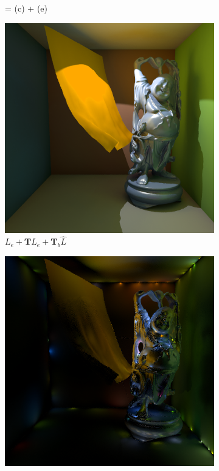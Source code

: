 \begin{figure}
\begin{center}
\begin{subfigure}[b]{0.195\textwidth}
		\caption{= (c) + (e)}
	\end{subfigure}
	\begin{subfigure}[b]{0.195\textwidth}
		\includegraphics[width=1.0\textwidth]{graphics/ir/ir-7-2}
		\caption{$L_e+\mathbf{T}L_e+\mathbf{T}_b\hat{L}$}
	\end{subfigure}
	\begin{subfigure}[b]{0.195\textwidth}
		\includegraphics[width=1.0\textwidth]{graphics/ir/ir-7-3}

\end{subfigure}
\end{center}
\end{figure}
